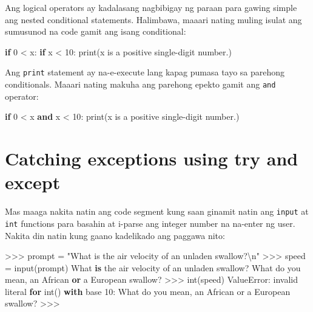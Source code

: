\documentclass[10pt,]{book}
\newenvironment{Shaded}{}{}
\newcommand{\BuiltInTok}[1]{\textcolor[rgb]{0.00,0.50,0.00}{#1}}
\newcommand{\CharTok}[1]{\textcolor[rgb]{0.25,0.44,0.63}{#1}}
\newcommand{\ControlFlowTok}[1]{\textcolor[rgb]{0.00,0.44,0.13}{\textbf{#1}}}
\newcommand{\DecValTok}[1]{\textcolor[rgb]{0.25,0.63,0.44}{#1}}
\newcommand{\KeywordTok}[1]{\textcolor[rgb]{0.00,0.44,0.13}{\textbf{#1}}}
\newcommand{\NormalTok}[1]{#1}
\newcommand{\OperatorTok}[1]{\textcolor[rgb]{0.40,0.40,0.40}{#1}}
\newcommand{\PreprocessorTok}[1]{\textcolor[rgb]{0.74,0.48,0.00}{#1}}
\newcommand{\StringTok}[1]{\textcolor[rgb]{0.25,0.44,0.63}{#1}}
\begin{document}
Ang logical operators ay kadalasang nagbibigay ng paraan para gawing
simple ang nested conditional statements. Halimbawa, maaari nating
muling isulat ang sumusunod na code gamit ang isang conditional:

\begin{Shaded}
\begin{Highlighting}[]
\ControlFlowTok{if} \DecValTok{0} \OperatorTok{\textless{}}\NormalTok{ x:}
    \ControlFlowTok{if}\NormalTok{ x }\OperatorTok{\textless{}} \DecValTok{10}\NormalTok{:}
        \BuiltInTok{print}\NormalTok{(}\StringTok{\textquotesingle{}x is a positive single{-}digit number.\textquotesingle{}}\NormalTok{)}
\end{Highlighting}
\end{Shaded}

Ang \texttt{print} statement ay na-e-execute lang kapag pumasa tayo sa
parehong conditionals. Maaari nating makuha ang parehong epekto gamit
ang \texttt{and} operator:

\begin{Shaded}
\begin{Highlighting}[]
\ControlFlowTok{if} \DecValTok{0} \OperatorTok{\textless{}}\NormalTok{ x }\KeywordTok{and}\NormalTok{ x }\OperatorTok{\textless{}} \DecValTok{10}\NormalTok{:}
    \BuiltInTok{print}\NormalTok{(}\StringTok{\textquotesingle{}x is a positive single{-}digit number.\textquotesingle{}}\NormalTok{)}
\end{Highlighting}
\end{Shaded}

\section{Catching exceptions using try and
except}\label{catching-exceptions-using-try-and-except}

Mas maaga nakita natin ang code segment kung saan ginamit natin ang
\texttt{input} at \texttt{int} functions para basahin at i-parse ang
integer number na na-enter ng user. Nakita din natin kung gaano
kadelikado ang paggawa nito:

\begin{Shaded}
\begin{Highlighting}[]
\OperatorTok{\textgreater{}\textgreater{}\textgreater{}}\NormalTok{ prompt }\OperatorTok{=} \StringTok{"What is the air velocity of an unladen swallow?}\CharTok{\textbackslash{}n}\StringTok{"}
\OperatorTok{\textgreater{}\textgreater{}\textgreater{}}\NormalTok{ speed }\OperatorTok{=} \BuiltInTok{input}\NormalTok{(prompt)}
\NormalTok{What }\KeywordTok{is}\NormalTok{ the air velocity of an unladen swallow?}
\NormalTok{What do you mean, an African }\KeywordTok{or}\NormalTok{ a European swallow?}
\OperatorTok{\textgreater{}\textgreater{}\textgreater{}} \BuiltInTok{int}\NormalTok{(speed)}
\PreprocessorTok{ValueError}\NormalTok{: invalid literal }\ControlFlowTok{for} \BuiltInTok{int}\NormalTok{() }\ControlFlowTok{with}
\NormalTok{base }\DecValTok{10}\NormalTok{: }\StringTok{\textquotesingle{}What do you mean, an African or a European swallow?\textquotesingle{}}
\OperatorTok{\textgreater{}\textgreater{}\textgreater{}}
\end{Highlighting}
\end{Shaded}
\end{document}
